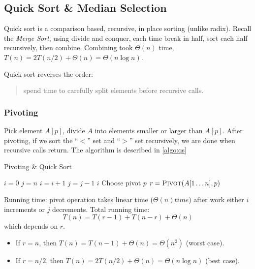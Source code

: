 \subsection{Quick Sort \& Median Selection}
Quick sort is a comparison based, recursive, in place sorting (unlike radix).
Recall the \emph{Merge Sort}, using divide and conquer,
each time break in half, sort each half recursively, then combine.
Combining took $\Theta(n)$ time, $T(n) = 2T(n/2) + \Theta(n) = \Theta(n \log n)$.

Quick sort reverses the order:
\begin{quote}
    spend time to carefully split elements before recursive calls.
\end{quote}

\subsubsection{Pivoting}
Pick element $A[p]$, divide $A$ into elements smaller or larger than $A[p]$.
After pivoting, if we sort the ``$<$'' set and ``$>$'' set recursively,
we are done when recursive calls return.
The algorithm is described in \cref{algo:qs}

\begin{algorithm}[H]
    \caption{Pivoting \& Quick Sort}\label{algo:qs}
    \begin{algorithmic}[1]
            \State{}
            \State $i = 0$
            \State $j = n$
                \Repeat
                    \State $i = i+1$
                \Repeat
                    \State $j = j-1$
                    \State{}
                \EndIf
            \EndWhile
            \State{}
            \Return $i$
        \EndProcedure
                \State Choose pivot $p$
                \State $r = \textsc{Pivot} (A[1 \ldots n], p)$
                \State {}
                \State {}
            \EndIf
        \EndProcedure
    \end{algorithmic}
\end{algorithm}

\analysis
Running time: pivot operation takes linear time ($\Theta(n) time$)
after  work either $i$ increments or $j$ decrements.
Total running time:
\[T(n) = T(r - 1) + T(n - r) + \Theta(n)\]
which depends on $r$.
\begin{itemize}
    \item If $r = n$, then $T(n) = T(n-1) + \Theta(n) = \Theta(n^2)$ (worst case).
    \item If $r = n/2$, then $T(n) = 2T(n/2) + \Theta(n) = \Theta(n\log n)$ (best case).
\end{itemize}

